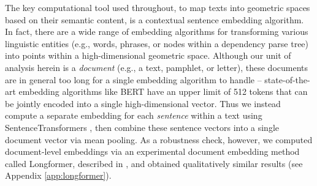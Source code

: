 The key computational tool used throughout, to map texts into geometric spaces based on their semantic content, is a contextual sentence embedding algorithm. In fact, there are a wide range of embedding algorithms for transforming various linguistic entities (e.g., words, phrases, or nodes within a dependency parse tree) into points within a high-dimensional geometric space. Although our unit of analysis herein is a \textit{document} (e.g., a text, pamphlet, or letter), these documents are in general too long for a single embedding algorithm to handle -- state-of-the-art embedding algorithms like BERT have an upper limit of 512 tokens that can be jointly encoded into a single high-dimensional vector. Thus we instead compute a separate embedding for each \textit{sentence} within a text using SentenceTransformers \parencite{reimers_sentence-bert_2019}, then combine these sentence vectors into a single document vector via mean pooling. As a robustness check, however, we computed document-level embeddings via an experimental document embedding method called Longformer, described in \cite{beltagy_longformer_2020}, and obtained qualitatively similar results (see Appendix \ref{app:longformer}).

